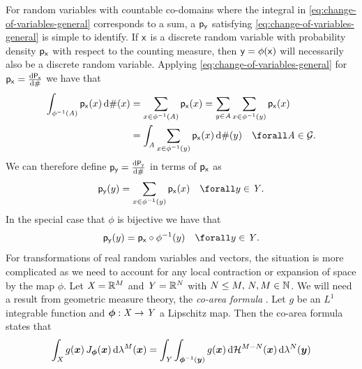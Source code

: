 For random variables with countable co-domains where the integral in \eqref{eq:change-of-variables-general} corresponds to a sum, a $\mathsf{p}_{\mathsf{y}}$ satisfying \eqref{eq:change-of-variables-general} is simple to identify. If $\mathsf{x}$ is a discrete random variable with probability density $\mathsf{p}_{\mathsf{x}}$ with respect to the counting measure, then $\mathsf{y} = \phi(\mathsf{x})$ will necessarily also be a discrete random variable. Applying \eqref{eq:change-of-variables-general} for $\mathsf{p}_{\mathsf{x}} = \frac{\mathrm{d} \mathsf{P}_{\mathsf{x}}}{\mathrm{d} \#}$ we have that
\begin{align}\label{eq:change-of-variables-discrete-derivation}
  \int_{\phi^{-1}(\set{A})} \pden{\rvar{x}}(x) \,\dr\countm(x) &= 
  \sum_{x\in\phi^{-1}(\set{A})} \pden{\rvar{x}}(x)  =
  \sum_{y \in \set{A}} \sum_{x\in\phi^{-1}(y)} \pden{\rvar{x}}(x) \nonumber \\
  &= \int_{\set{A}} \sum_{x\in\phi^{-1}(y)} \pden{\rvar{x}}(x) \,\dr\countm(y)
  \quad \forall \set{A} \in \sset{G}.
\end{align}
We can therefore define $\mathsf{p}_{\mathsf{y}} = \frac{\mathrm{d} \mathsf{P}_{\mathsf{y}}}{\mathrm{d} \#}$ in terms of $\mathsf{p}_{\mathsf{x}}$ as
\begin{equation}\label{eq:change-of-variables-discrete}
  \pden{\rvar{y}}(y) = \sum_{x \in \phi^{-1}(y)} \pden{\rvar{x}}(x)
  \quad \forall y \in \set{Y}.
\end{equation}
In the special case that $\phi$ is bijective we have that 
\begin{equation}\label{eq:change-of-variables-discrete-bijective}
  \pden{\rvar{y}}(y) = \pden{\rvar{x}}\circ\phi^{-1}(y)
  \quad \forall y \in \set{Y}.
\end{equation}
For transformations of real random variables and vectors, the situation is more complicated as we need to account for any local contraction or expansion of space by the map $\phi$. Let $\mathit{X} = \mathbb{R}^M$ and $\mathit{Y} = \mathbb{R}^N$ with $N \leq M, \, N,M \in \mathbb{N}$. %
We will need a result from geometric measure theory, the \emph{co-area formula} \citep{federer1969geometric}. Let $g$ be an $L^1$ integrable function and $\boldsymbol{\phi} : \mathit{X} \to \mathit{Y}$ a Lipschitz map. Then the co-area formula states that
\begin{equation}\label{eq:co-area-formula}
  \int_{\set{X}} 
    g(\vct{x}) \, J_{\vct{\phi}}(\vct{x})
  \,\dr\lambda^{M}(\vct{x}) =
  \int_{\set{Y}} \int_{\vct{\phi}^{-1}(\vct{y})}
    g(\vct{x})
  \,\dr\haum{M-N}(\vct{x})\,\dr\lebm{N}(\vct{y})
\end{equation}
